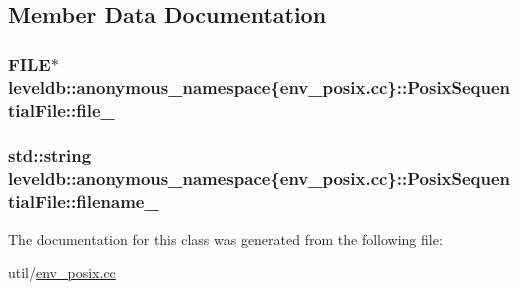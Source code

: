 \subsection{Member Data Documentation}
\hypertarget{classleveldb_1_1anonymous__namespace_02env__posix_8cc_03_1_1_posix_sequential_file_a5723dd958fd01da95c18b2282731e44b}{}
\subsubsection[{file\+\_\+}]{\setlength{\rightskip}{0pt plus 5cm}F\+I\+L\+E$\ast$ leveldb\+::anonymous\+\_\+namespace\{env\+\_\+posix.\+cc\}\+::Posix\+Sequential\+File\+::file\+\_\+\hspace{0.3cm}{\ttfamily [private]}}\label{classleveldb_1_1anonymous__namespace_02env__posix_8cc_03_1_1_posix_sequential_file_a5723dd958fd01da95c18b2282731e44b}
\hypertarget{classleveldb_1_1anonymous__namespace_02env__posix_8cc_03_1_1_posix_sequential_file_a51e3fa326513f55bb7263d89b70b149f}{}
\subsubsection[{filename\+\_\+}]{\setlength{\rightskip}{0pt plus 5cm}std\+::string leveldb\+::anonymous\+\_\+namespace\{env\+\_\+posix.\+cc\}\+::Posix\+Sequential\+File\+::filename\+\_\+\hspace{0.3cm}{\ttfamily [private]}}\label{classleveldb_1_1anonymous__namespace_02env__posix_8cc_03_1_1_posix_sequential_file_a51e3fa326513f55bb7263d89b70b149f}


The documentation for this class was generated from the following file\+:\begin{DoxyCompactItemize}
\item 
util/\hyperlink{env__posix_8cc}{env\+\_\+posix.\+cc}\end{DoxyCompactItemize}
